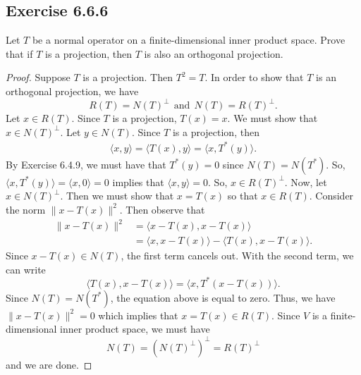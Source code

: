 \subsection*{Exercise 6.6.6} Let \( T \) be a normal operator on a finite-dimensional inner product space. Prove that if \( T  \) is a projection, then \( T  \) is also an orthogonal projection.
\begin{proof}
Suppose \( T  \) is a projection. Then \( T^{2} = T  \). In order to show that \( T  \) is an orthogonal projection, we have 
\[  R(T) = N(T)^{\perp} \ \ \text{and} \ \ N(T) = R(T)^{\perp}.  \]
Let \( x \in R(T) \). Since \( T  \) is a projection, \( T(x) = x  \). We must show that \( x \in N(T)^{\perp} \). Let \( y \in N(T) \). Since \( T  \) is a projection, then   
\begin{align*}
    \langle x , y \rangle = \langle T(x) , y \rangle = \langle x  , T^{*}(y) \rangle.  
\end{align*}
By Exercise 6.4.9, we must have that \( T^{*}(y) = 0  \) since \( N(T) = N(T^{*}) \). So, \( \langle x  ,  T^{*}(y) \rangle = \langle x  , 0  \rangle = 0  \) implies that \( \langle x  , y \rangle = 0 \). So, \( x \in R(T)^{\perp} \). Now, let \( x \in N(T)^{\perp} \). Then we must show that \( x = T(x) \) so that \( x \in R(T) \). Consider the norm \( \|x  - T(x)\|^{2} \). Then observe that 
\begin{align*}
    \|x - T(x)\|^{2} &= \langle  x - T(x ) ,  x - T(x) \rangle \\
                     &= \langle x  ,  x - T(x) \rangle - \langle  T(x) ,   x - T(x) \rangle.
\end{align*}
Since \( x - T(x) \in N(T) \), the first term cancels out. With the second term, we can write
\[  \langle T(x)  ,  x - T(x) \rangle = \langle  x  ,  T^{*}(x - T(x)) \rangle. \]
Since \( N(T) = N(T^{*}) \), the equation above is equal to zero. Thus, we have \( \|x - T(x)\|^{2} = 0  \) which implies that \( x = T(x) \in R(T) \). Since \( V  \) is a finite-dimensional inner product space, we must have  
\[  N(T) = (N(T)^{\perp} )^{\perp} = R(T)^{\perp}  \]
and we are done.

\end{proof}

